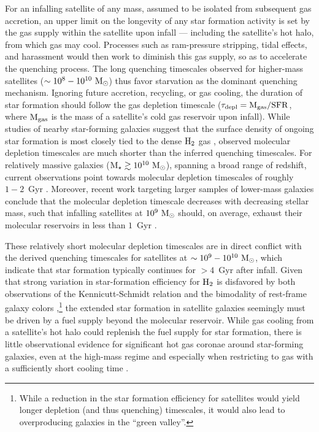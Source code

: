 For an infalling satellite of any mass, assumed to be isolated from
subsequent gas accretion, an upper limit on the longevity of any star
formation activity is set by the gas supply within the satellite upon
infall --- including the satellite's hot halo, from which gas may
cool. Processes such as ram-pressure stripping, tidal effects, and
harassment would then work to diminish this gas supply, so as to
accelerate the quenching process. The long quenching timescales
observed for higher-mass satellites ($\sim10^{8}-10^{10}~{\rm M}_{\odot}$) thus
favor starvation as the dominant quenching mechanism. Ignoring future
accretion, recycling, or gas cooling, the duration of star formation
should follow the gas depletion timescale ($\tau_{\rm depl} = {\rm
  M}_{\rm gas} / {\rm SFR}$, where ${\rm M}_{\rm gas}$ is the mass of
a satellite's cold gas reservoir upon infall). While studies of nearby
star-forming galaxies suggest that the surface density of ongoing star
formation is most closely tied to the dense ${\rm H}_{2}$ gas
\citep{bigiel08, bigiel11, leroy08}, observed molecular depletion
timescales are much shorter than the inferred quenching
timescales. For relatively massive galaxies (${\rm M}_{\star} \gtrsim
10^{10}~{\rm M}_{\odot}$), spanning a broad range of redshift, current
observations point towards molecular depletion timescales of roughly
$1-2$~Gyr \citep{bigiel11, leroy13, saintonge11, tacconi10, tacconi13,
  genzel10, genzel15}. Moreover, recent work targeting larger samples
of lower-mass galaxies conclude that the molecular depletion timescale
decreases with decreasing stellar mass, such that infalling satellites
at $10^{9}~{\rm M}_{\odot}$ should, on average, exhaust their molecular
reservoirs in less than $1$~Gyr \citep{saintonge11, boselli14}.


These relatively short molecular depletion timescales are in direct
conflict with the derived quenching timescales for satellites at
$\sim10^{9}-10^{10}~{\rm M}_{\odot}$, which indicate that star formation
typically continues for $>4$~Gyr after infall. Given that strong
variation in star-formation efficiency for ${\rm H}_{2}$ is disfavored
by both observations of the Kennicutt-Schmidt relation
\citep{bigiel08, leroy08, krumholz05} and the bimodality of rest-frame
galaxy colors \citep[or specific star formation rates,][]{balogh09,
  weinmann10},\footnote{While a reduction in the star formation
  efficiency for satellites would yield longer depletion (and thus
  quenching) timescales, it would also lead to overproducing galaxies
  in the ``green valley''.} the extended star formation in satellite
galaxies seemingly must be driven by a fuel supply beyond the
molecular reservoir. While gas cooling from a satellite's hot halo
could replenish the fuel supply for star formation, there is little
observational evidence for significant hot gas coronae around
star-forming galaxies, even at the high-mass regime and especially
when restricting to gas with a sufficiently short cooling time
\citep[][]{sun07, rasmussen09, crain10, miller15}.


